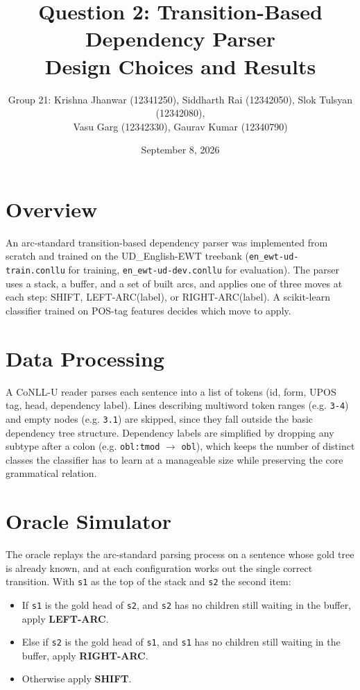\documentclass[11pt]{article}
\title{Question 2: Transition-Based Dependency Parser\\ \large Design Choices and Results}
\author{Group 21: Krishna Jhanwar (12341250), Siddharth Rai (12342050), Slok Tulsyan (12342080), \\ Vasu Garg (12342330), Gaurav Kumar (12340790)}
\date{September 8, 2026}
\newcommand{\code}[1]{\texttt{#1}}
\begin{document}
\maketitle

\section{Overview}

An arc-standard transition-based dependency parser was implemented from scratch and trained on the UD\_English-EWT treebank (\code{en\_ewt-ud-train.conllu} for training, \code{en\_ewt-ud-dev.conllu} for evaluation). The parser uses a stack, a buffer, and a set of built arcs, and applies one of three moves at each step: SHIFT, LEFT-ARC(label), or RIGHT-ARC(label). A scikit-learn classifier trained on POS-tag features decides which move to apply.

\section{Data Processing}

A CoNLL-U reader parses each sentence into a list of tokens (id, form, UPOS tag, head, dependency label). Lines describing multiword token ranges (e.g. \code{3-4}) and empty nodes (e.g. \code{3.1}) are skipped, since they fall outside the basic dependency tree structure. Dependency labels are simplified by dropping any subtype after a colon (e.g. \code{obl:tmod} $\rightarrow$ \code{obl}), which keeps the number of distinct classes the classifier has to learn at a manageable size while preserving the core grammatical relation.

\section{Oracle Simulator}

The oracle replays the arc-standard parsing process on a sentence whose gold tree is already known, and at each configuration works out the single correct transition. With \code{s1} as the top of the stack and \code{s2} the second item:

\begin{itemize}
  \item If \code{s1} is the gold head of \code{s2}, and \code{s2} has no children still waiting in the buffer, apply \textbf{LEFT-ARC}.
  \item Else if \code{s2} is the gold head of \code{s1}, and \code{s1} has no children still waiting in the buffer, apply \textbf{RIGHT-ARC}.
  \item Otherwise apply \textbf{SHIFT}.
\end{itemize}
\end{document}
